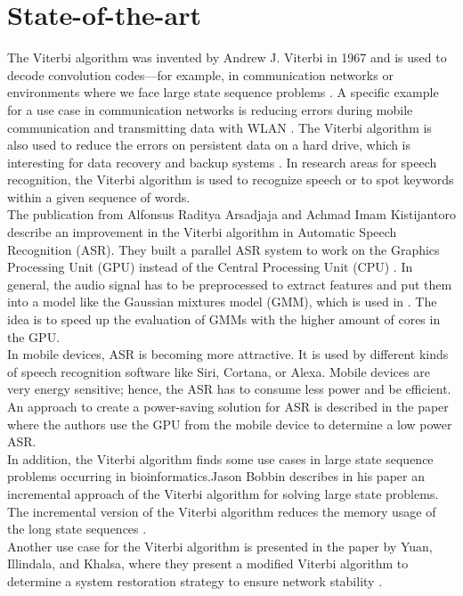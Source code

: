 \documentclass[12pt,journal,compsoc]{IEEEtran}
\begin{document}
\section{State-of-the-art}
The Viterbi algorithm was invented by Andrew J. Viterbi in 1967 \cite{article:forney} and is used to decode convolution codes—for example, in communication networks or environments where we face large state sequence problems \cite{article:forney}. A specific example for a use case in communication networks is reducing errors during mobile communication and transmitting data with WLAN \cite{eetimes:viterbiWLAN}. The Viterbi algorithm is also used to reduce the errors on persistent data on a hard drive, which is interesting for data recovery and backup systems \cite{journal:viterbiHardDrive}. In research areas for speech recognition, the Viterbi algorithm is used to recognize speech or to spot keywords within a given sequence of words.\\
The publication from Alfonsus Raditya Arsadjaja and Achmad Imam Kistijantoro describe an improvement in the Viterbi algorithm in Automatic Speech Recognition (ASR). They built a parallel ASR system to work on the Graphics Processing Unit (GPU) instead of the Central Processing Unit (CPU) \cite{article:Arsadjaja&Kistijantoro}. In general, the audio signal has to be preprocessed to extract features and put them into a model like the Gaussian mixtures model (GMM), which is used in \cite{article:Arsadjaja&Kistijantoro}. The idea is to speed up the evaluation of GMMs with the higher amount of cores in the GPU.\\
In mobile devices, ASR is becoming more attractive. It is used by different kinds of speech recognition software like Siri, Cortana, or Alexa. Mobile devices are very energy sensitive; hence, the ASR has to consume less power and be efficient. An approach to create a power-saving solution for ASR is described in the paper \cite{article:moblieGpu} where the authors use the GPU from the mobile device to determine a low power ASR. \\
In addition, the Viterbi algorithm finds some use cases in large state sequence problems occurring in bioinformatics.Jason  Bobbin describes in his paper an incremental approach of the Viterbi algorithm for solving large state problems. The incremental version of the Viterbi algorithm reduces the memory usage of the long state sequences \cite{article:bioinformatics}.\\ 
Another use case for the Viterbi algorithm is presented in the paper by Yuan, Illindala, and Khalsa, where they present a modified Viterbi algorithm to determine a system restoration strategy to ensure network stability \cite{article:gridResilience}.\\
\end{document}
